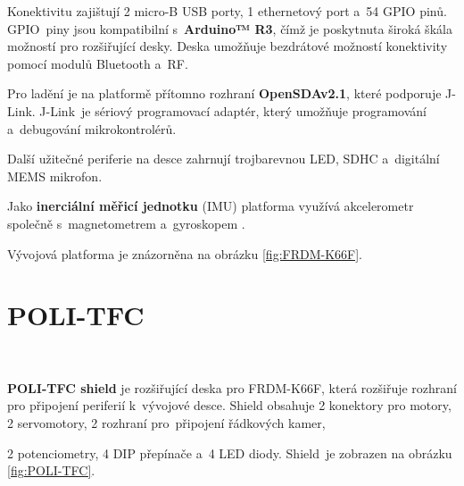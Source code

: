 Konektivitu zajištují 2 micro-B USB porty, 1 ethernetový port a~54 GPIO pinů.
GPIO~piny jsou kompatibilní s~\textbf{Arduino™ R3}, čímž je poskytnuta široká škála
možností pro rozšiřující desky. Deska umožňuje bezdrátové možností konektivity
pomocí modulů Bluetooth a~RF.

Pro ladění je na platformě přítomno rozhraní \textbf{OpenSDAv2.1}, které podporuje
J-Link. J-Link~je sériový programovací adaptér, který umožňuje programování
a~debugování mikrokontrolérů.

Další užitečné periferie na desce zahrnují trojbarevnou LED, SDHC a~digitální MEMS
mikrofon.

Jako \textbf{inerciální měřicí jednotku} (IMU) platforma využívá akcelerometr
společně s~magnetometrem a~gyroskopem \cite{frdmk66UserGuide}.

Vývojová platforma je znázorněna na obrázku \ref{fig:FRDM-K66F}.

\section{POLI-TFC}
\label{sec:POLI-TFC}\

\textbf{POLI-TFC shield} je rozšiřující deska pro FRDM-K66F, která rozšiřuje
rozhraní pro připojení periferií k~vývojové desce. Shield obsahuje 2 konektory
pro motory, 2 servomotory, 2 rozhraní pro~připojení řádkových kamer,

2 potenciometry, 4 DIP přepínače a~4 LED diody. Shield~je zobrazen na obrázku
\ref{fig:POLI-TFC}.

